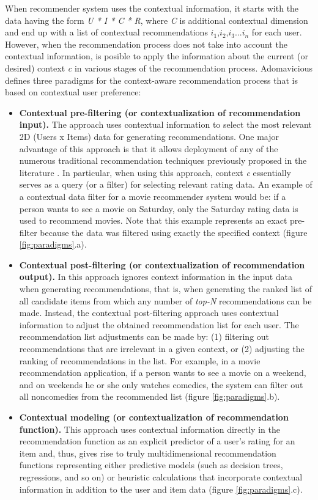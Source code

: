 When recommender system uses the contextual information, it starts
with the data having the form \textit{U * I * C * R}, where \textit{C}
is additional contextual dimension and end up with a list of
contextual recommendations $i_{1}$,$i_{2}$,$i_{3}$...$i_{n}$ for each
user. However, when the recommendation process does not take into
account  the contextual information, is posible to apply the
information about the current (or desired) context \textit{c} in
various stages of the recommendation process.
Adomavicious\cite{adomavicius2011context} defines three paradigms for
the context-aware recommendation process that is based on contextual
user preference:
\begin{itemize}
\item \textbf{Contextual pre-filtering (or contextualization of
recommendation input).} The approach uses contextual information to
select the most relevant 2D (Users x Items) data for generating
recommendations. One major advantage of this approach is that it
allows deployment of any of the numerous traditional recommendation
techniques previously proposed in the literature \cite{adomavicius2005toward}.
In particular, when using this approach, context
\textit{c} essentially serves as a query (or a filter) for selecting
relevant rating data. An example of a contextual data filter for a
movie recommender system would be: if a person wants to see a movie on
Saturday, only the Saturday rating data is used to recommend movies.
Note that this example represents an exact pre-filter because the data
was filtered using exactly the specified context (figure
\ref{fig:paradigms}.a).
\item \textbf{Contextual post-filtering (or contextualization of
recommendation output).} In this approach ignores context information
in the input data when generating recommendations, that is, when
generating the ranked list of all candidate items from which any
number of \textit{top-N} recommendations can be made. Instead,  the
contextual post-filtering approach uses contextual information to
adjust the obtained recommendation list for each user. The
recommendation list adjustments can be made by: (1) filtering out
recommendations that are irrelevant in a given context, or (2)
adjusting the ranking of recommendations in the list. For example, in
a movie recommendation application, if a person wants to see a movie
on a weekend, and on weekends he or she only watches comedies, the
system can filter out all noncomedies from the recommended list
(figure \ref{fig:paradigms}.b).
\item \textbf{Contextual modeling (or contextualization of
recommendation function).} This approach uses contextual information
directly in the recommendation function as an explicit predictor of a
user's rating for an item and, thus, gives rise to truly
multidimensional recommendation functions representing either
predictive models (such as decision trees, regressions, and so on) or
heuristic calculations that incorporate contextual information in
addition to the user and item data (figure \ref{fig:paradigms}.c).\\
\end{itemize}
